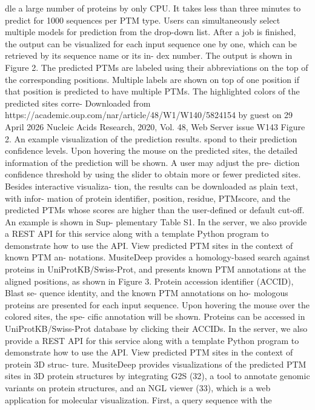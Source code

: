 dle a large number of proteins by only CPU. It takes less
than three minutes to predict for 1000 sequences per PTM
type. Users can simultaneously select multiple models for
prediction from the drop-down list. After a job is finished,
the output can be visualized for each input sequence one by
one, which can be retrieved by its sequence name or its in-
dex number. The output is shown in Figure 2. The predicted
PTMs are labeled using their abbreviations on the top of the
corresponding positions. Multiple labels are shown on top
of one position if that position is predicted to have multiple
PTMs. The highlighted colors of the predicted sites corre-
Downloaded from https://academic.oup.com/nar/article/48/W1/W140/5824154 by guest on 29 April 2026
Nucleic Acids Research, 2020, Vol. 48, Web Server issue W143
Figure 2. An example visualization of the prediction results.
spond to their prediction confidence levels. Upon hovering
the mouse on the predicted sites, the detailed information
of the prediction will be shown. A user may adjust the pre-
diction confidence threshold by using the slider to obtain
more or fewer predicted sites. Besides interactive visualiza-
tion, the results can be downloaded as plain text, with infor-
mation of protein identifier, position, residue, PTMscore,
and the predicted PTMs whose scores are higher than the
user-defined or default cut-off. An example is shown in Sup-
plementary Table S1. In the server, we also provide a REST
API for this service along with a template Python program
to demonstrate how to use the API.
View predicted PTM sites in the context of known PTM an-
notations.
MusiteDeep provides a homology-based search
against proteins in UniProtKB/Swiss-Prot, and presents
known PTM annotations at the aligned positions, as shown
in Figure 3. Protein accession identifier (ACCID), Blast se-
quence identity, and the known PTM annotations on ho-
mologous proteins are presented for each input sequence.
Upon hovering the mouse over the colored sites, the spe-
cific annotation will be shown. Proteins can be accessed in
UniProtKB/Swiss-Prot database by clicking their ACCIDs.
In the server, we also provide a REST API for this service
along with a template Python program to demonstrate how
to use the API.
View predicted PTM sites in the context of protein 3D struc-
ture.
MusiteDeep provides visualizations of the predicted
PTM sites in 3D protein structures by integrating G2S (32),
a tool to annotate genomic variants on protein structures,
and an NGL viewer (33), which is a web application for
molecular visualization. First, a query sequence with the

